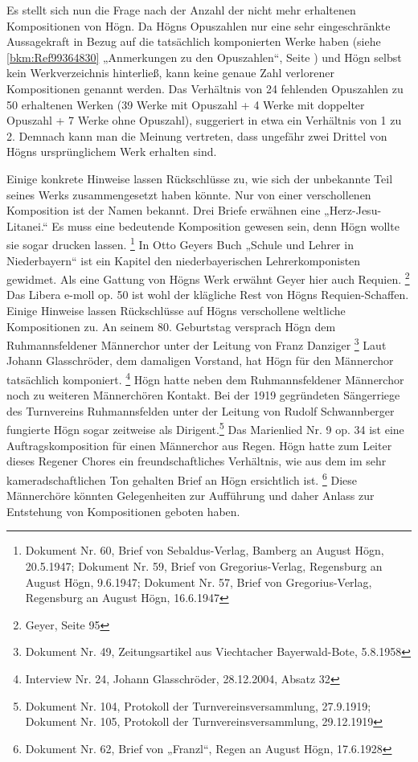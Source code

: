 Es stellt sich nun die Frage nach der Anzahl der nicht mehr erhaltenen
Kompositionen von Högn. Da Högns Opuszahlen nur eine sehr
eingeschränkte Aussagekraft in Bezug auf die tatsächlich komponierten
Werke haben (siehe \ref{bkm:Ref99364830} „Anmerkungen zu den
Opuszahlen“, Seite \pageref{bkm:Ref98509933}) und Högn selbst kein
Werkverzeichnis hinterließ, kann keine genaue Zahl verlorener
Kompositionen genannt werden. Das Verhältnis von 24 fehlenden
Opuszahlen zu 50 erhaltenen Werken (39 Werke mit Opuszahl + 4 Werke mit
doppelter Opuszahl + 7 Werke ohne Opuszahl), suggeriert in etwa ein
Verhältnis von 1 zu 2. Demnach kann man die Meinung vertreten, dass
ungefähr zwei Drittel von Högns ursprünglichem Werk erhalten sind.

Einige konkrete Hinweise lassen Rückschlüsse zu, wie sich der unbekannte
Teil seines Werks zusammengesetzt haben könnte. Nur von einer
verschollenen Komposition ist der Namen bekannt. Drei Briefe erwähnen
eine „Herz-Jesu-Litanei.“ Es muss eine bedeutende Komposition gewesen
sein, denn Högn wollte sie sogar drucken lassen.
\footnote{Dokument Nr. 60, Brief von Sebaldus-Verlag, Bamberg an August Högn, 20.5.1947;
Dokument Nr. 59, Brief von Gregorius-Verlag, Regensburg an August Högn, 9.6.1947;
Dokument Nr. 57, Brief von Gregorius-Verlag, Regensburg an August Högn, 16.6.1947}
In Otto
Geyers Buch „Schule und Lehrer in Niederbayern“ ist ein Kapitel den
niederbayerischen Lehrerkomponisten gewidmet. Als eine Gattung von
Högns Werk erwähnt Geyer hier auch Requien. \footnote{Geyer, Seite 95}
Das Libera e-moll op. 50 ist wohl der klägliche Rest von Högns
Requien-Schaffen. Einige Hinweise lassen Rückschlüsse auf Högns
verschollene weltliche Kompositionen zu. An seinem 80. Geburtstag
versprach Högn dem Ruhmannsfeldener Männerchor unter der Leitung von
Franz Danziger  \footnote{Dokument Nr. 49, Zeitungsartikel aus
Viechtacher Bayerwald-Bote, 5.8.1958} Laut Johann Glasschröder, dem
damaligen Vorstand, hat Högn für den Männerchor tatsächlich
komponiert. \footnote{Interview Nr. 24, Johann Glasschröder,
28.12.2004, Absatz 32} Högn hatte neben dem Ruhmannsfeldener Männerchor
noch zu weiteren Männerchören Kontakt. Bei der 1919 gegründeten
Sängerriege des Turnvereins Ruhmannsfelden unter der Leitung von Rudolf
Schwannberger fungierte Högn sogar zeitweise als Dirigent.\footnote{
Dokument Nr. 104, Protokoll der Turnvereinsversammlung, 27.9.1919;
Dokument Nr. 105, Protokoll der Turnvereinsversammlung, 29.12.1919} Das
Marienlied Nr. 9 op. 34 ist eine Auftragskomposition für einen
Männerchor aus Regen. Högn hatte zum Leiter dieses Regener Chores ein
freundschaftliches Verhältnis, wie aus dem im sehr kameradschaftlichen
Ton gehalten Brief an Högn ersichtlich ist. \footnote{Dokument Nr. 62,
Brief von „Franzl“, Regen an August Högn, 17.6.1928} Diese Männerchöre
könnten Gelegenheiten zur Aufführung und daher Anlass zur Entstehung
von Kompositionen geboten haben.

